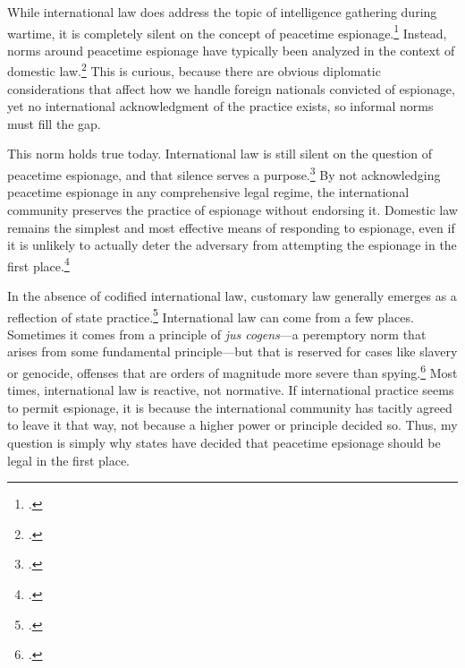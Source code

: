 \documentclass{memoir}
\begin{document}
\begin{refsegment}
While international law does address the topic of intelligence gathering during wartime, it is completely silent on the concept of peacetime espionage.\footcite{radsan_unresolved_2007} Instead, norms around peacetime espionage have typically been analyzed in the context of domestic law.\footcite{demarest_espionage_1995} This is curious, because there are obvious diplomatic considerations that affect how we handle foreign nationals convicted of espionage, yet no international acknowledgment of the practice exists, so informal norms must fill the gap.

This norm holds true today. International law is still silent on the question of peacetime espionage, and that silence serves a purpose.\footcite[p.~653]{beim_enforcing_2018} By not acknowledging peacetime espionage in any comprehensive legal regime, the international community preserves the practice of espionage without endorsing it. Domestic law remains the simplest and most effective means of responding to espionage, even if it is unlikely to actually deter the adversary from attempting the espionage in the first place.\footcite[p.~657]{beim_enforcing_2018}

In the absence of codified international law, customary law generally emerges as a reflection of state practice.\footcite[p.~628]{sulmasy_counterintuitive_2007} International law can come from a few places. Sometimes it comes from a principle of \emph{jus cogens}---a peremptory norm that arises from some fundamental principle---but that is reserved for cases like slavery or genocide, offenses that are orders of magnitude more severe than spying.\footcite[p.~629]{sulmasy_counterintuitive_2007} Most times, international law is reactive, not normative. If international practice seems to permit espionage, it is because the international community has tacitly agreed to leave it that way, not because a higher power or principle decided so. Thus, my question is simply why states have decided that peacetime epsionage should be legal in the first place.



\end{refsegment}
\end{document}
